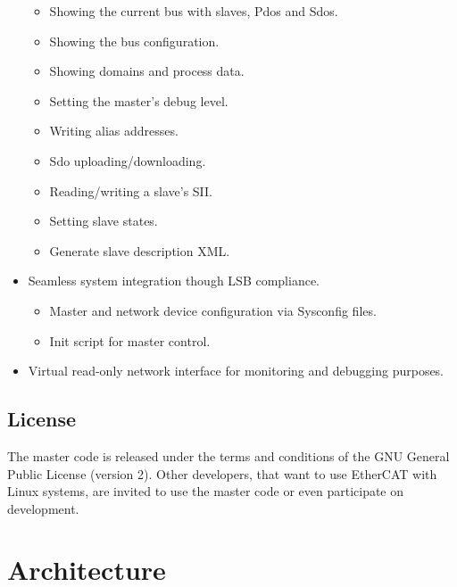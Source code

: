 \documentclass[a4paper,12pt,BCOR6mm,bibtotoc,idxtotoc]{scrbook}
\begin{document}
\begin{itemize}
\begin{itemize}
  \item Showing the current bus with slaves, Pdos and Sdos.
  \item Showing the bus configuration.
  \item Showing domains and process data.
  \item Setting the master's debug level.
  \item Writing alias addresses.
  \item Sdo uploading/downloading.
  \item Reading/writing a slave's SII.
  \item Setting slave states.
  \item Generate slave description XML.

  \end{itemize}

\item Seamless system integration though LSB compliance.

  \begin{itemize}

  \item Master and network device configuration via Sysconfig files.

  \item Init script for master control.

  \end{itemize}

\item Virtual read-only network interface for monitoring and debugging
  purposes.

\end{itemize}


\section{License}
\label{sec:license}

The master code is released under the terms and conditions of the GNU
General Public License \cite{gpl} (version 2). Other
developers, that want to use EtherCAT with Linux systems, are invited
to use the master code or even participate on development.


\chapter{Architecture}
\label{sec:arch}
\end{document}
